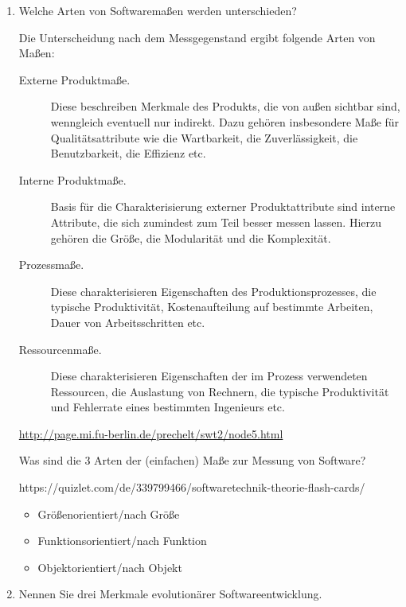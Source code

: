 \documentclass{bschlangaul-aufgabe}
\begin{document}
\begin{enumerate}

\item Welche Arten von Softwaremaßen werden unterschieden?

\begin{bAntwort}
Die Unterscheidung nach dem Messgegenstand ergibt folgende Arten von
Maßen:

\begin{description}
\item[Externe Produktmaße.]
Diese beschreiben Merkmale des Produkts, die von außen sichtbar sind,
wenngleich eventuell nur indirekt. Dazu gehören insbesondere Maße für
Qualitätsattribute wie die Wartbarkeit, die Zuverlässigkeit, die
Benutzbarkeit, die Effizienz etc.

\item[Interne Produktmaße.]
Basis für die Charakterisierung externer Produktattribute sind interne
Attribute, die sich zumindest zum Teil besser messen lassen. Hierzu
gehören \zB die Größe, die Modularität und die Komplexität.

\item[Prozessmaße.]
Diese charakterisieren Eigenschaften des Produktionsprozesses, \zB
die typische Produktivität, Kostenaufteilung auf bestimmte Arbeiten,
Dauer von Arbeitsschritten etc.

\item[Ressourcenmaße.]
Diese charakterisieren Eigenschaften der im Prozess verwendeten
Ressourcen, \zB die Auslastung von Rechnern, die typische
Produktivität und Fehlerrate eines bestimmten Ingenieurs etc.
\end{description}

\url{http://page.mi.fu-berlin.de/prechelt/swt2/node5.html}

Was sind die 3 Arten der (einfachen) Maße zur Messung von Software?

https://quizlet.com/de/339799466/softwaretechnik-theorie-flash-cards/

\begin{itemize}
\item Größenorientiert/nach Größe

\item Funktionsorientiert/nach Funktion

\item Objektorientiert/nach Objekt
\end{itemize}
\end{bAntwort}


\item Nennen Sie drei Merkmale evolutionärer
Softwareentwicklung.


\end{enumerate}
\end{document}
